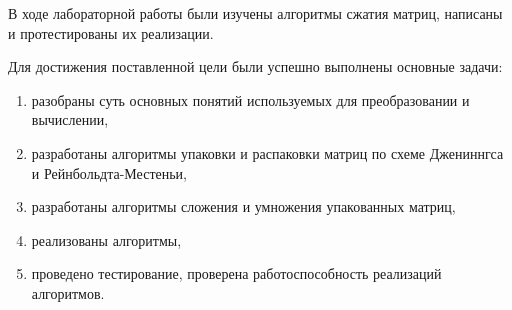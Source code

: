 
В ходе лабораторной работы были изучены алгоритмы сжатия матриц, написаны и протестированы их реализации.

Для достижения поставленной цели были успешно выполнены основные задачи: 
\begin{enumerate}
	\item разобраны суть основных понятий используемых для преобразовании и вычислении,
	\item разработаны алгоритмы упаковки и распаковки матриц по схеме Джениннгса и Рей\-нбольдта-Местеньи,
	\item разработаны алгоритмы сложения и умножения упакованных матриц,
	\item реализованы алгоритмы,
	\item проведено тестирование, проверена работоспособность реализаций алгоритмов.
\end{enumerate}
